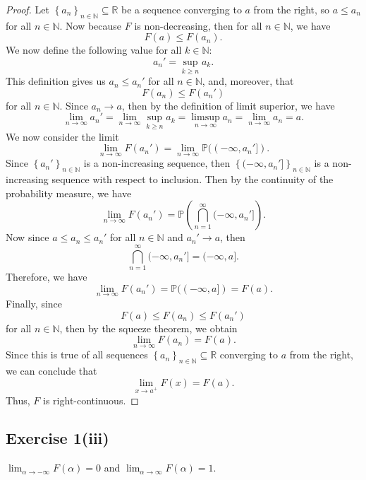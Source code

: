 \documentclass[12pt]{article}
\newenvironment{problem}
    {\begin{lrbox}{\mybox}\begin{minipage}{0.98\textwidth}}
    {\end{minipage}\end{lrbox}\framebox[\textwidth]{\usebox{\mybox}}}
\newcommand{\ds}{\displaystyle}
\newcommand{\N}{\mathbb{N}} %
\newcommand{\R}{\mathbb{R}} %
\renewcommand{\P}{\mathbb{P}} %
\newcommand{\<}{\left\langle} %
\renewcommand{\>}{\right\rangle} %
\newcommand{\seq}[2][n]{\left\{#2\right\}_{#1\in\N}} %
\begin{document}
\begin{proof}
    Let $\seq{a_n} \subseteq\R$ be a sequence converging to $a$ from the right, so $a \leq a_n$ for all $n\in\N$. Now because $F$ is non-decreasing, then for all $n\in\N$, we have
    \[F(a) \leq F(a_n).\]
    We now define the following value for all $k\in\N$:
    \[a_n' = \sup_{k\geq n} a_k.\]
    This definition gives us $a_n\leq a_n'$ for all $n\in\N$, and, moreover, that
    \[F(a_n) \leq F(a_n')\]
    for all $n\in\N$. Since $a_n\to a$, then by the definition of limit superior, we have
    \[\lim_{n\to\infty}a_n' = \lim_{n\to\infty}\sup_{k\geq n} a_k = \limsup_{n\to\infty}a_n = \lim_{n\to\infty}a_n = a.\]
    We now consider the limit
    \[\lim_{n\to\infty}F(a_n') = \lim_{n\to\infty}\P((-\infty,a_n']).\]
    Since $\seq{a_n'}$ is a non-increasing sequence, then $\seq{(-\infty,a_n']}$ is a non-increasing sequence with respect to inclusion. Then by the continuity of the probability measure, we have
    \[\lim_{n\to\infty}F(a_n') = \P\left(\bigcap_{n=1}^\infty (-\infty, a_n']\right).\]
    Now since $a\leq a_n \leq a_n'$ for all $n\in\N$ and $a_n' \to a$, then
    \[\bigcap_{n=1}^\infty (-\infty, a_n'] = (-\infty, a].\]
    Therefore, we have
    \[\lim_{n\to\infty}F(a_n') = \P((-\infty,a]) = F(a).\]
    Finally, since
    \[F(a) \leq F(a_n) \leq F(a_n')\]
    for all $n\in\N$, then by the squeeze theorem, we obtain
    \[\lim_{n\to\infty}F(a_n) = F(a).\]
    Since this is true of all sequences $\seq{a_n}\subseteq\R$ converging to $a$ from the right, we can conclude that
    \[\lim_{x\to a^+}F(x) = F(a).\]
    Thus, $F$ is right-continuous.
    
\end{proof}

\newpage
\subsection*{Exercise 1(iii)}
\begin{problem}
    $\ds\lim_{\alpha\to-\infty}F(\alpha)=0$ and $\ds\lim_{\alpha\to\infty}F(\alpha)=1$.
\end{problem}
\end{document}
